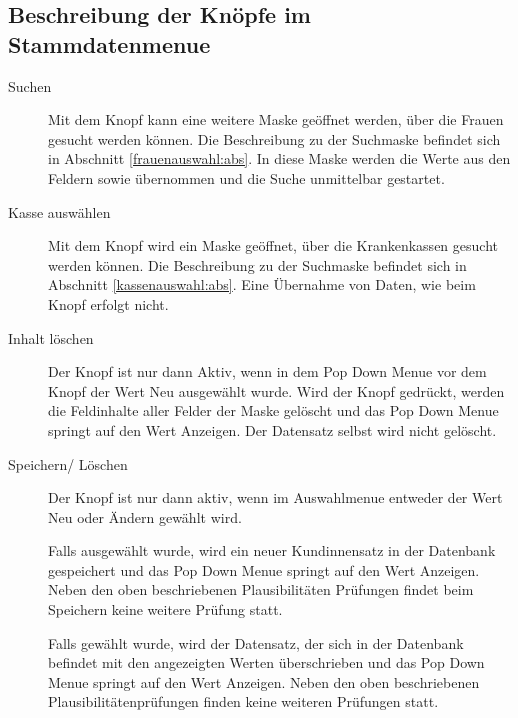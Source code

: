 \subsection{Beschreibung der Knöpfe im Stammdatenmenue}
\begin{description}
\item[Suchen] 
Mit dem Knopf  kann eine weitere Maske geöffnet
werden, über die Frauen gesucht werden können. Die Beschreibung zu der
Suchmaske befindet sich in Abschnitt \vref{frauenauswahl:abs}.
In diese Maske werden die Werte aus den Feldern 
sowie
 übernommen und die Suche unmittelbar gestartet.
\item[Kasse auswählen] 
Mit dem Knopf  wird ein Maske
geöffnet, über die Krankenkassen gesucht werden können. Die Beschreibung zu
der Suchmaske befindet sich in Abschnitt \vref{kassenauswahl:abs}. Eine
Übernahme von Daten, wie beim Knopf  erfolgt nicht.
\item[Inhalt löschen] 
Der Knopf  ist nur dann Aktiv, wenn in dem
Pop Down Menue vor dem Knopf der Wert Neu ausgewählt wurde. Wird der Knopf
gedrückt, werden die Feldinhalte aller Felder der Maske gelöscht und das
Pop Down Menue springt auf den Wert Anzeigen. Der Datensatz selbst wird
nicht gelöscht.
\item[Speichern/ Löschen] Der Knopf  ist nur dann aktiv,
wenn im
Auswahlmenue entweder der Wert Neu oder Ändern gewählt wird. 
\par
Falls 
ausgewählt wurde, wird ein neuer Kundinnensatz in der Datenbank gespeichert
und das Pop Down Menue springt auf den Wert Anzeigen. Neben den oben
beschriebenen Plausibilitäten Prüfungen findet beim Speichern keine weitere
Prüfung statt.\par
Falls  gewählt wurde, wird der Datensatz, der sich in der Datenbank
befindet mit den angezeigten Werten überschrieben und das Pop Down Menue
springt auf den Wert Anzeigen. Neben den oben beschriebenen
Plausibilitätenprüfungen finden keine weiteren Prüfungen statt.


\end{description}

